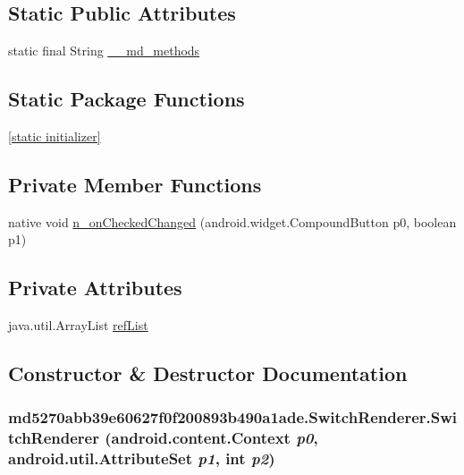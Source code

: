 \subsection*{Static Public Attributes}
\begin{CompactItemize}
\item 
static final String \hyperlink{classmd5270abb39e60627f0f200893b490a1ade_1_1_switch_renderer_70baf7daa85c86b196cc9c27e5478a8c}{\_\-\_\-md\_\-methods}
\end{CompactItemize}
\subsection*{Static Package Functions}
\begin{CompactItemize}
\item 
\hyperlink{classmd5270abb39e60627f0f200893b490a1ade_1_1_switch_renderer_1ec023784c291e40dea5636e84ab320b}{\mbox{[}static initializer\mbox{]}}
\end{CompactItemize}
\subsection*{Private Member Functions}
\begin{CompactItemize}
\item 
native void \hyperlink{classmd5270abb39e60627f0f200893b490a1ade_1_1_switch_renderer_d23030fbecb761ed1f07b9bbedb69913}{n\_\-onCheckedChanged} (android.widget.CompoundButton p0, boolean p1)
\end{CompactItemize}
\subsection*{Private Attributes}
\begin{CompactItemize}
\item 
java.util.ArrayList \hyperlink{classmd5270abb39e60627f0f200893b490a1ade_1_1_switch_renderer_a9fe52d28f98ed4682e97e2a914a77b5}{refList}
\end{CompactItemize}


\subsection{Constructor \& Destructor Documentation}
\hypertarget{classmd5270abb39e60627f0f200893b490a1ade_1_1_switch_renderer_28d4f09146c66b0991594aa4e5b0f7ff}{
\subsubsection[{SwitchRenderer}]{\setlength{\rightskip}{0pt plus 5cm}md5270abb39e60627f0f200893b490a1ade.SwitchRenderer.SwitchRenderer (android.content.Context {\em p0}, \/  android.util.AttributeSet {\em p1}, \/  int {\em p2})}}
\label{classmd5270abb39e60627f0f200893b490a1ade_1_1_switch_renderer_28d4f09146c66b0991594aa4e5b0f7ff}


